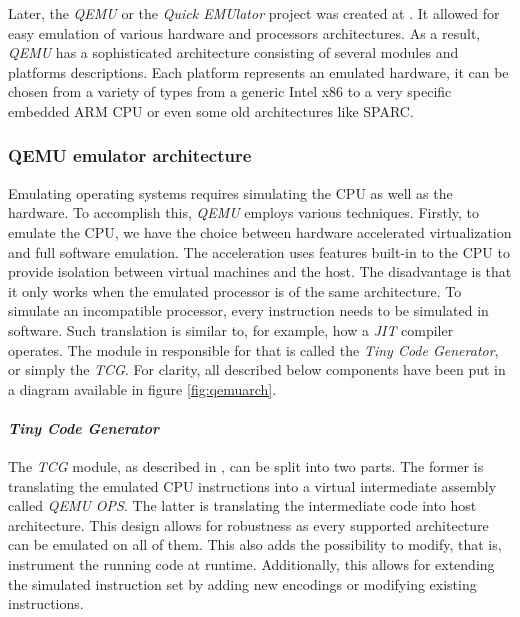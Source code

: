 Later, the \textit{QEMU} or the \textit{Quick EMUlator} project was created at \cite{qemurepo}. It allowed for easy emulation of various hardware and processors architectures. As a result, \textit{QEMU} has a sophisticated architecture consisting of several modules and platforms descriptions. Each platform represents an emulated hardware, it can be chosen from a variety of types from a generic Intel x86 to a very specific embedded ARM CPU or even some old architectures like SPARC.

\subsubsection{QEMU emulator architecture}

Emulating operating systems requires simulating the CPU as well as the hardware. To accomplish this, \textit{QEMU} employs various techniques. Firstly, to emulate the CPU, we have the choice between hardware accelerated virtualization and full software emulation. The acceleration uses features built-in to the CPU to provide isolation between virtual machines and the host. The disadvantage is that it only works when the emulated processor is of the same architecture. To simulate an incompatible processor, every instruction needs to be simulated in software. Such translation is similar to, for example, how a \textit{JIT} compiler operates. The module in  responsible for that is called the \textit{Tiny Code Generator}, or simply the \textit{TCG}. For clarity, all described below components have been put in a diagram available in figure \ref{fig:qemuarch}.

\paragraph{\textit{Tiny Code Generator}}
The \textit{TCG} module, as described in \cite{qemutcg}, can be split into two parts. The former is translating the emulated CPU instructions into a virtual intermediate assembly called \textit{QEMU OPS}. The latter is translating the intermediate code into host architecture. This design allows for robustness as every supported architecture can be emulated on all of them. This also adds the possibility to modify, that is, instrument the running code at runtime. Additionally, this allows for extending the simulated instruction set by adding new encodings or modifying existing instructions.

